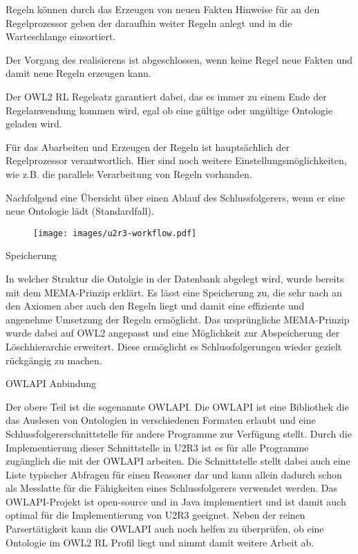 Regeln können durch das Erzeugen von neuen Fakten Hinweise für an den Regelprozessor geben der daraufhin weiter Regeln anlegt und in die Warteschlange einsortiert.

Der Vorgang des realisierens ist abgeschlossen, wenn keine Regel neue Fakten und damit neue Regeln erzeugen kann.

Der OWL2 RL Regelsatz garantiert dabei, das es immer zu einem Ende der Regelanwendung kommen wird, egal ob eine gültige oder ungültige Ontologie geladen wird.

Für das Abarbeiten und Erzeugen der Regeln ist hauptsächlich der Regelprozessor verantwortlich. Hier sind noch weitere Einstellungsmöglichkeiten, wie z.B. die parallele Verarbeitung von Regeln vorhanden.

Nachfolgend eine Übersicht über einen Ablauf des Schlussfolgerers, wenn er eine neue Ontologie lädt (Standardfall).

\begin{figure}
\texttt{[image: images/u2r3-workflow.pdf]}
\end{figure}


Speicherung

In welcher Struktur die Ontolgie in der Datenbank abgelegt wird, wurde bereits mit dem MEMA-Prinzip erklärt. Es lässt eine Speicherung zu, die sehr nach an den Axiomen aber auch den Regeln liegt und damit eine effiziente und angenehme Umsetzung der Regeln ermöglicht. Das ursprüngliche MEMA-Prinzip wurde dabei auf OWL2 angepasst und eine Möglichkeit zur Abspeicherung der Löschhierarchie erweitert. Diese ermöglicht es Schlussfolgerungen wieder gezielt rückgängig zu machen.

OWLAPI Anbindung

Der obere Teil ist die sogenannte OWLAPI. Die OWLAPI ist eine Bibliothek die das Auslesen von Ontologien in verschiedenen Formaten erlaubt und eine Schlussfolgererschnittstelle für andere Programme zur Verfügung stellt. Durch die Implementierung dieser Schnittstelle in U2R3 ist es für alle Programme zugänglich die mit der OWLAPI arbeiten.
Die Schnittstelle stellt dabei auch eine Liste typischer Abfragen für einen Reasoner dar und kann allein dadurch schon als Messlatte für die Fähigkeiten eines Schlussfolgerers verwendet werden. Das OWLAPI-Projekt ist open-source und in Java implementiert und ist damit auch optimal für die Implementierung von U2R3 geeignet. Neben der reinen Parsertätigkeit kann die OWLAPI auch noch helfen zu überprüfen, ob eine Ontologie im OWL2 RL Profil liegt und nimmt damit weitere Arbeit ab.


